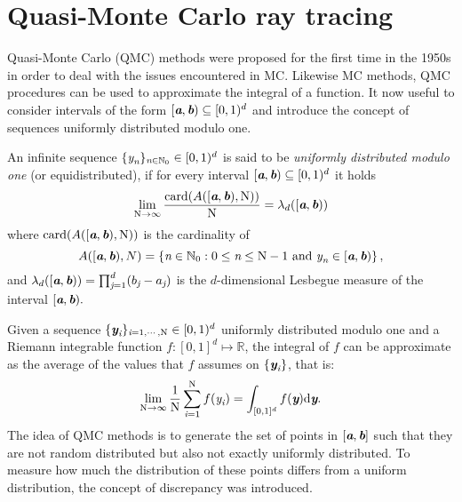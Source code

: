 \section{Quasi-Monte Carlo ray tracing}\label{sec:QMC}
Quasi-Monte Carlo (QMC) methods were proposed for the first time in the 1950s in order to deal with the issues encountered in MC.
Likewise MC methods, QMC procedures can be used to approximate the integral of a function. 
It now useful to consider intervals of the form $[\textit{\textbf{a}}, \textit{\textbf{b}})\subseteq[0,1)^d$ and introduce the concept of sequences uniformly distributed modulo one.
\begin{definition}
An infinite sequence $\{\textit{y}_{\textit{n}}\}_{\textit{n}\in\mathbb{N}_0} \in [0,1)^d$ is said to be \textit{uniformly distributed modulo one} (or equidistributed), if for every interval $[\textit{\textbf{a}},\textit{\textbf{b}})\subseteq[0,1)^d$ it holds
\begin{equation}
\lim_{\textrm{N}\rightarrow \infty}\frac{\textrm{card}(A([\textit{\textbf{a}},\textit{\textbf{b}}), \textrm{N}))}{\textrm{N}} = \lambda_d([\textit{\textbf{a}},\textit{\textbf{b}}))
\end{equation}
where $\textrm{card}(A([\textit{\textbf{a}},\textit{\textbf{b}}), \textrm{N}))$ is the cardinality of
\begin{equation}
A([\textit{\textbf{a}},\textit{\textbf{b}}), N) = \{\textit{n}\in \mathbb{N}_0: 0\leq\textit{n}\leq \textrm{N}-1 \mbox{ and } \textit{y}_{\textit{n}}\in [\textit{\textbf{a}},\textit{\textbf{b}})\}\,,
\end{equation}
and $\lambda_d([\textit{\textbf{a}},\textit{\textbf{b}})) = \prod_{\textit{j}=1}^{d}(b_{\textit{j}}-a_{\textit{j}})$ is the $d$-dimensional Lesbegue measure of the interval $[\textit{\textbf{a}},\textit{\textbf{b}}).$
\end{definition}
Given a sequence $\{\textit{\textbf{y}}_{\textit{i}}\}_{\textit{i} = 1, \cdots, \textrm{N}}\in[0,1)^d$ uniformly distributed modulo one and a 
Riemann integrable function $f:[0,1]^d\mapsto \mathbb{R}$, the integral of $f$ can be approximate as the average of the values that $f$ assumes on $\{\textit{\textbf{y}}_{\textit{i}}\}$, that is:
\begin{equation}
 \lim_{\textrm{N}\rightarrow \infty}\frac{1}{\textrm{N}}\sum_{\textit{i}=1}^{\textrm{N}}f(\textit{y}_{\textit{i}}) = \int_{[0,1]^d}f(\textit{\textbf{y}})\textrm{d}\textit{\textbf{y}}.
\end{equation}
The idea of QMC methods is to generate the set of points in $[\textit{\textbf{a}},\textit{\textbf{b}}]$ such that they are not random distributed but also not exactly uniformly distributed. 
To measure how much the distribution of these points differs from a uniform distribution, the concept of discrepancy was introduced. 
